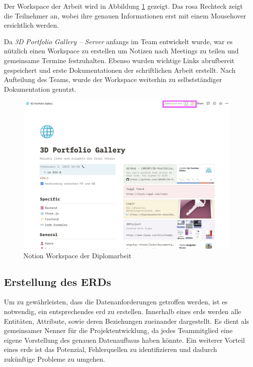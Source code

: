 Der Workspace der Arbeit wird in Abbildung \ref{fig:impl:notion-page} gezeigt.
Das rosa Rechteck zeigt die Teilnehmer an, wobei ihre genauen Informationen erst mit einem Mousehover ersichtlich werden. 

Da \emph{3D Portfolio Gallery – Server} anfangs im Team entwickelt wurde, war es nützlich einen Workspace zu erstellen um Notizen nach Meetings zu teilen und gemeinsame Termine festzuhalten.
Ebenso wurden wichtige Links abrufbereit gespeichert und erste Dokumentationen der schriftlichen Arbeit erstellt.
Nach Aufteilung des Teams, wurde der Workspace weiterhin zu selbstständiger Dokumentation genutzt. 

\begin{figure} [h t]
  \centering
  \includegraphics[scale=0.3]{pics/NotionPage.png}
  \caption{Notion Workspace der Diplomarbeit}
  \label{fig:impl:notion-page}
\end{figure}

\subsection{Erstellung des ERDs}
Um zu gewährleisten, dass die Datenanforderungen getroffen werden, ist es notwendig, ein entsprechendes \gls{erd} zu erstellen.
Innerhalb eines \gls{erd}s werden alle Entitäten, Attribute, sowie deren Beziehungen zueinander dargestellt.
Es dient als gemeinsamer Nenner für die Projektentwicklung, da jedes Teammitglied eine eigene Vorstellung des genauen Datenaufbaus haben könnte. 
Ein weiterer Vorteil eines \gls{erd}s ist das Potenzial, Fehlerquellen zu identifizieren und dadurch zukünftige Probleme zu umgehen. 

